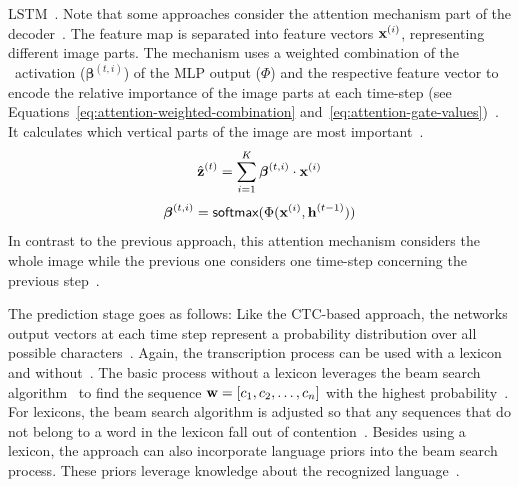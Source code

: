 \ac{LSTM}~\citep{ghosh_visual_2017}.
Note that some approaches consider the attention mechanism part of the
decoder~\citep{shi_aster_2019,shi_robust_2016}.
The feature map is separated into feature vectors $\textbf{x}^{(i)}$, representing different image parts.
The mechanism uses a weighted combination of the \sfmx\ activation ($\boldsymbol{\beta}^{(t,i)}$) of
the \ac{MLP} output ($\Phi$) and the respective feature vector to encode the relative importance of
the image parts at each time-step (see Equations~\ref{eq:attention-weighted-combination}
and~\ref{eq:attention-gate-values})~\citep{ghosh_visual_2017,xu_show_2016}.
It calculates which vertical parts of the image are most important~\citep{ghosh_visual_2017}.
\begin{equation}\label{eq:attention-weighted-combination}
    \hat{\textbf{z}}^{(t)}=\sum_{i=1}^{K}\boldsymbol{\beta}^{(t,i)}\cdot \textbf{x}^{(i)}
\end{equation}
\begin{equation}\label{eq:attention-gate-values}
    \boldsymbol{\beta}^{(t,i)}=\textsf{softmax}(\Phi(\textbf{x}^{(i)},\textbf{h}^{(t-1)}))
\end{equation}
In contrast to the previous approach, this attention mechanism considers the whole image while the
previous one considers one time-step concerning the previous
step~\citep{shi_robust_2016,ghosh_visual_2017}.

The prediction stage goes as follows:
Like the \ac{CTC}-based approach, the networks output vectors at each time step represent a
probability distribution over all possible characters~\citep{ghosh_visual_2017}.
Again, the transcription process can be used with a lexicon and without~\citep{ghosh_visual_2017}.
The basic process without a lexicon leverages the beam search algorithm~\citep{ghosh_visual_2017}
to find the sequence $\textbf{w}=[c_1,c_2,\ldots,c_n]$ with the highest
probability~\citep{ghosh_visual_2017}.
For lexicons, the beam search algorithm is adjusted so that any sequences that do not belong
to a word in the lexicon fall out of contention~\citep{ghosh_visual_2017}.
Besides using a lexicon, the approach can also incorporate language priors into
the beam search process.
These priors leverage knowledge about the recognized language~\citep{ghosh_visual_2017}.

